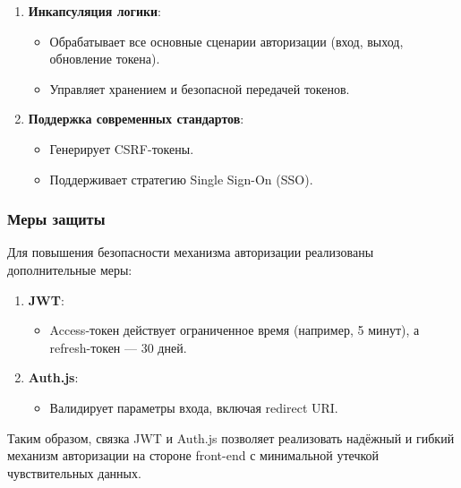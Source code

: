 \begin{enumerate}
    \item \textbf{Инкапсуляция логики}:
    \begin{itemize}
        \item Обрабатывает все основные сценарии авторизации (вход, выход, обновление токена).
        \item Управляет хранением и безопасной передачей токенов.
    \end{itemize}

    \item \textbf{Поддержка современных стандартов}:
    \begin{itemize}
        \item Генерирует CSRF-токены.
        \item Поддерживает стратегию Single Sign-On (SSO).
    \end{itemize}
\end{enumerate}

\subsubsection{Меры защиты}
Для повышения безопасности механизма авторизации реализованы дополнительные меры:

\begin{enumerate}
    \item \textbf{JWT}:
    \begin{itemize}
        \item Access-токен действует ограниченное время (например, 5 минут), а refresh-токен — 30 дней.
    \end{itemize}

    \item \textbf{Auth.js}:
    \begin{itemize}
        \item Валидирует параметры входа, включая redirect URI.
    \end{itemize}
\end{enumerate}

Таким образом, связка JWT и Auth.js позволяет реализовать надёжный и гибкий механизм авторизации на стороне front-end с минимальной утечкой чувствительных данных.

